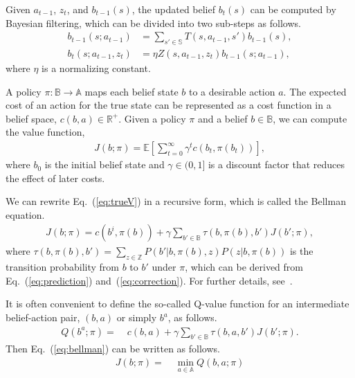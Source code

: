 \documentclass[letterpaper, 10 pt, conference]{ieeeconf}  %
\begin{document}
Given $a_{t-1}$, $z_t$, and $b_{t-1}(s)$,
the updated belief $b_t(s)$ can be computed by Bayesian filtering, which can be divided into two sub-steps as follows.
\begin{align}
  b_{t-1}(s; a_{t-1}) &= \sum_{s' \in \mathbb{S}} T(s, a_{t-1}, s') b_{t-1}(s),
  \label{eq:prediction}
  \\
  b_t(s; a_{t-1}, z_t) &= \eta Z(s, a_{t-1}, z_t) b_{t-1}(s; a_{t-1}),
  \label{eq:correction}
\end{align}
where $\eta$ is a normalizing constant.

A policy $\pi : \mathbb{B} \rightarrow \mathbb{A}$ maps each belief state $b$ to a desirable action $a$.
The expected cost of an action for the true state can be represented as a cost function in a belief space, $c(b, a) \in \mathbb{R}^+$.
Given a policy $\pi$ and a belief $b \in \mathbb{B}$, we can compute the value function,
\begin{align}
  J(b; \pi) = \mathbb{E} \left[ \sum_{t=0}^\infty \gamma^t c(b_t, \pi(b_t)) \right]\!,
  \label{eq:trueV}
\end{align}
where $b_0$ is the initial belief state and 	$\gamma \in (0, 1]$ is a discount factor that reduces the effect of later costs.


We can rewrite Eq.~(\ref{eq:trueV}) in a recursive form, which is called the Bellman equation.
\begin{align}
J(b; \pi) = c(b^i, \pi(b)) %
   + \gamma \sum_{b' \in \mathbb{B}} \tau(b, \pi(b), b') J(b'; \pi),
  \label{eq:bellman}
\end{align}
where $\tau(b, \pi(b), b') = \sum_{z \in \mathbb{Z}} P(b'|b,\pi(b),z) P(z|b,\pi(b))$ is the transition probability from $b$ to $b'$ under $\pi$,
which can be derived from Eq.~(\ref{eq:prediction}) and~(\ref{eq:correction}).
For further details, see~\cite{Ross08}.

It is often convenient to define the so-called Q-value function for an intermediate belief-action pair, $(b, a)$ or simply $b^a$, as follows.
\begin{align}
  Q(b^a; \pi) =\; & c(b, a) + \gamma \sum_{b' \in \mathbb{B}} \tau(b, a, b') J(b'; \pi).
  \label{eq:qfunction}
\end{align}
Then Eq.~(\ref{eq:bellman}) can be written as follows.
\begin{align}
J(b; \pi) =\; & \min_{a \in \mathbb{A}} Q(b, a; \pi)
\label{eq:minq}
\end{align}
\end{document}
